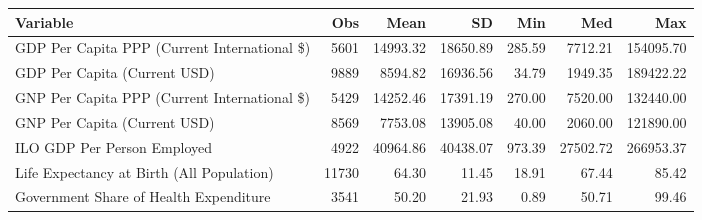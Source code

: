 \begin{tabular}{lrrrrrr}
\toprule
                                    Variable &   Obs &     Mean &       SD &    Min &      Med &       Max \\
\midrule
GDP Per Capita PPP (Current International \$) & 5601 & 14993.32 & 18650.89 & 285.59 & 7712.21 & 154095.70 \\
GDP Per Capita (Current USD) & 9889 & 8594.82 & 16936.56 & 34.79 & 1949.35 & 189422.22 \\
GNP Per Capita PPP (Current International \$) & 5429 & 14252.46 & 17391.19 & 270.00 & 7520.00 & 132440.00 \\
GNP Per Capita (Current USD) & 8569 & 7753.08 & 13905.08 & 40.00 & 2060.00 & 121890.00 \\
ILO GDP Per Person Employed & 4922 & 40964.86 & 40438.07 & 973.39 & 27502.72 & 266953.37 \\
Life Expectancy at Birth (All Population) & 11730 & 64.30 & 11.45 & 18.91 & 67.44 & 85.42 \\
Government Share of Health Expenditure & 3541 & 50.20 & 21.93 & 0.89 & 50.71 & 99.46 \\
\bottomrule
\end{tabular}
